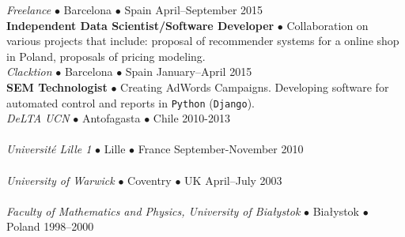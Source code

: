 \documentclass[a4paper, oneside]{scrreprt}
\begin{document}
\noindent\makebox[\linewidth]{\rule{\textwidth}{0.4pt}}

\newpage 

\noindent\makebox[\linewidth]{\rule{\textwidth}{0.4pt}}

\vspace{0.5cm}



\noindent{}\textit{Freelance} $\bullet$ 
Barcelona $\bullet$ Spain \hfill April--September 2015\\
\noindent\textbf{\small Independent Data Scientist/Software Developer} $\bullet$ Collaboration on various projects that include: proposal of recommender systems for a
online shop in Poland, proposals of pricing modeling. \\
\noindent{}\textit{Clacktion} $\bullet$ 
Barcelona $\bullet$ Spain \hfill January--April 2015\\
\noindent\textbf{\small SEM Technologist} $\bullet$ Creating AdWords Campaigns.
Developing software for automated control and reports in \texttt{Python} (\texttt{Django}).\\ 
\noindent{}\textit{DeLTA UCN} $\bullet$ 
Antofagasta $\bullet$ Chile \hfill 2010-2013\\
\\
\noindent{}\textit{Universit{\'e} Lille 1} $\bullet$ Lille $\bullet$ France \hfill September-November 2010\\
\\
\noindent{}\textit{University of Warwick} 
$\bullet$ Coventry $\bullet$ UK \hfill April–July 2003\\
\\
\noindent{}\textit{Faculty of Mathematics and Physics, University
  of Bia{\l}ystok} $\bullet$  Bia{\l}ystok $\bullet$ Poland \hfill 1998--2000\\ 
\\
\end{document}
